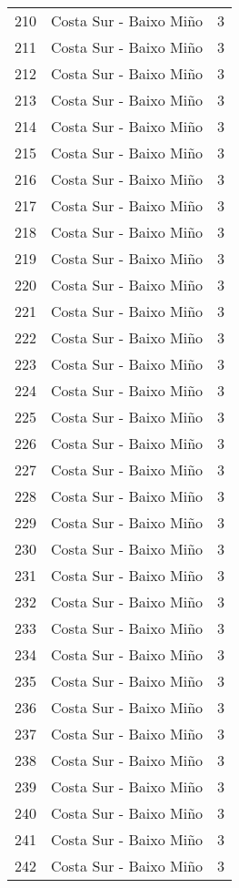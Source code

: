 \begin{table}[p]
\begin{tabular}{rlr}
  210 & Costa Sur - Baixo Miño &   3 \\ 
  211 & Costa Sur - Baixo Miño &   3 \\ 
  212 & Costa Sur - Baixo Miño &   3 \\ 
  213 & Costa Sur - Baixo Miño &   3 \\ 
  214 & Costa Sur - Baixo Miño &   3 \\ 
  215 & Costa Sur - Baixo Miño &   3 \\ 
  216 & Costa Sur - Baixo Miño &   3 \\ 
  217 & Costa Sur - Baixo Miño &   3 \\ 
  218 & Costa Sur - Baixo Miño &   3 \\ 
  219 & Costa Sur - Baixo Miño &   3 \\ 
  220 & Costa Sur - Baixo Miño &   3 \\ 
  221 & Costa Sur - Baixo Miño &   3 \\ 
  222 & Costa Sur - Baixo Miño &   3 \\ 
  223 & Costa Sur - Baixo Miño &   3 \\ 
  224 & Costa Sur - Baixo Miño &   3 \\ 
  225 & Costa Sur - Baixo Miño &   3 \\ 
  226 & Costa Sur - Baixo Miño &   3 \\ 
  227 & Costa Sur - Baixo Miño &   3 \\ 
  228 & Costa Sur - Baixo Miño &   3 \\ 
  229 & Costa Sur - Baixo Miño &   3 \\ 
  230 & Costa Sur - Baixo Miño &   3 \\ 
  231 & Costa Sur - Baixo Miño &   3 \\ 
  232 & Costa Sur - Baixo Miño &   3 \\ 
  233 & Costa Sur - Baixo Miño &   3 \\ 
  234 & Costa Sur - Baixo Miño &   3 \\ 
  235 & Costa Sur - Baixo Miño &   3 \\ 
  236 & Costa Sur - Baixo Miño &   3 \\ 
  237 & Costa Sur - Baixo Miño &   3 \\ 
  238 & Costa Sur - Baixo Miño &   3 \\ 
  239 & Costa Sur - Baixo Miño &   3 \\ 
  240 & Costa Sur - Baixo Miño &   3 \\ 
  241 & Costa Sur - Baixo Miño &   3 \\ 
  242 & Costa Sur - Baixo Miño &   3 \\ 

\end{tabular}
\end{table}

